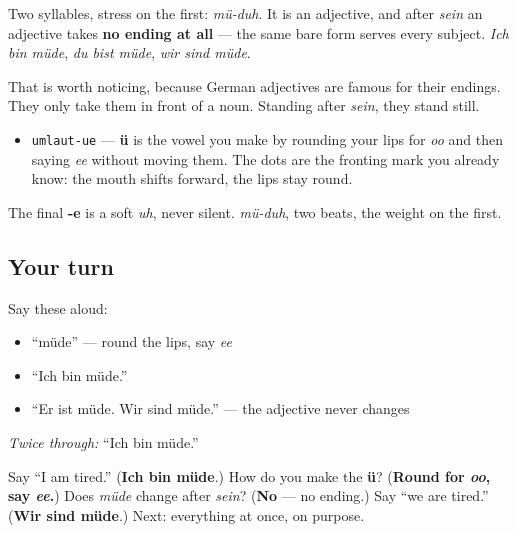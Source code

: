 Two syllables, stress on the first: \emph{mü-duh}. It is an adjective, and after \emph{sein} an adjective takes \textbf{no ending at all} — the same bare form serves every subject. \emph{Ich bin müde}, \emph{du bist müde}, \emph{wir sind müde}.

That is worth noticing, because German adjectives are famous for their endings. They only take them in front of a noun. Standing after \emph{sein}, they stand still.

\begin{sounds}
\begin{itemize}
\raggedright
  \item \texttt{umlaut-ue} — \textbf{ü} is the vowel you make by rounding your lips for \emph{oo} and then saying \emph{ee} without moving them. The dots are the fronting mark you already know: the mouth shifts forward, the lips stay round.
\end{itemize}

The final \textbf{-e} is a soft \emph{uh}, never silent. \emph{mü-duh}, two beats, the weight on the first.
\end{sounds}

\subsection*{Your turn}
Say these aloud:

\begin{itemize}
\raggedright
  \item \textquotedblleft{}müde\textquotedblright{} — round the lips, say \emph{ee}
  \item \textquotedblleft{}Ich bin müde.\textquotedblright{}
  \item \textquotedblleft{}Er ist müde. Wir sind müde.\textquotedblright{} — the adjective never changes
\end{itemize}

\emph{Twice through:} \textquotedblleft{}Ich bin müde.\textquotedblright{}

\begin{tcolorbox}[breakable,colback=teal!4,colframe=teal!35!black,title={Before you move on}]
Say \textquotedblleft{}I am tired.\textquotedblright{} (\textbf{Ich bin müde}.) How do you make the \textbf{ü}? (\textbf{Round for \emph{oo}, say \emph{ee}.}) Does \emph{müde} change after \emph{sein}? (\textbf{No} — no ending.) Say \textquotedblleft{}we are tired.\textquotedblright{} (\textbf{Wir sind müde}.) Next: everything at once, on purpose.
\end{tcolorbox}
